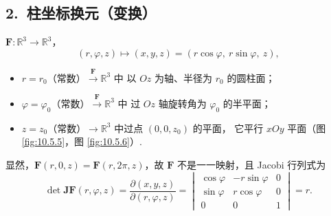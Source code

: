 \subsection*{2.\ 柱坐标换元（变换）}

$\boldsymbol{F}\colon \mathbb{R}^3 \to \mathbb{R}^3$，
\[
(r, \varphi, z) \mapsto (x, y, z) = (r\cos\varphi,\ r\sin\varphi,\ z),
\]
\begin{itemize}
  \item $r = r_0$（常数）$\xrightarrow{\boldsymbol{F}} \mathbb{R}^3$ 中
        以 $Oz$ 为轴、半径为 $r_0$ 的圆柱面；
  \item $\varphi = \varphi_0$（常数）$\xrightarrow{\boldsymbol{F}} \mathbb{R}^3$ 中
        过 $Oz$ 轴旋转角为 $\varphi_0$ 的半平面；
  \item $z = z_0$（常数）$\longrightarrow \mathbb{R}^3$ 中过点 $(0, 0, z_0)$ 的平面，
        它平行 $xOy$ 平面（图 \ref{fig:10.5.5}，图 \ref{fig:10.5.6}）.
\end{itemize}
显然，$\boldsymbol{F}(r, 0, z) = \boldsymbol{F}(r, 2\pi, z)$，故 $\boldsymbol{F}$ 不是一一映射，且 Jacobi 行列式为
\[
\det \boldsymbol{J}\boldsymbol{F}(r, \varphi, z)
= \frac{\partial(x, y, z)}{\partial(r, \varphi, z)}
= \begin{vmatrix}
  \cos\varphi & -r\sin\varphi & 0\\
  \sin\varphi & r\cos\varphi & 0\\
  0 & 0 & 1
 \end{vmatrix}
= r.
\]

